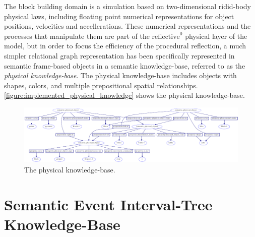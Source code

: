 The block building domain is a simulation based on two-dimensional
ridid-body physical laws, including floating point numerical
representations for object positions, velocities and accellerations.
These numerical representations and the processes that manipulate them
are part of the $\text{reflective}^0$ physical layer of the model, but
in order to focus the efficiency of the procedural reflection, a much
simpler relational graph representation has been specifically
represented in semantic frame-based objects in a semantic
knowledge-base, referred to as the \emph{physical knowledge-base}.
The physical knowledge-base includes objects with shapes, colors, and
multiple prepositional spatial relationships.
{\mbox{\autoref{figure:implemented_physical_knowledge}}} shows the
physical knowledge-base.
\begin{figure}
\begin{center}
\includegraphics[width=24cm]{gfx/implemented_physical_knowledge}
\end{center}
\hspace{4cm}\parbox{15cm}{\caption[The physical knowledge-base.]{The
    physical
    knowledge-base.}\label{figure:implemented_physical_knowledge}}
\end{figure}

\section{Semantic Event Interval-Tree Knowledge-Base}

